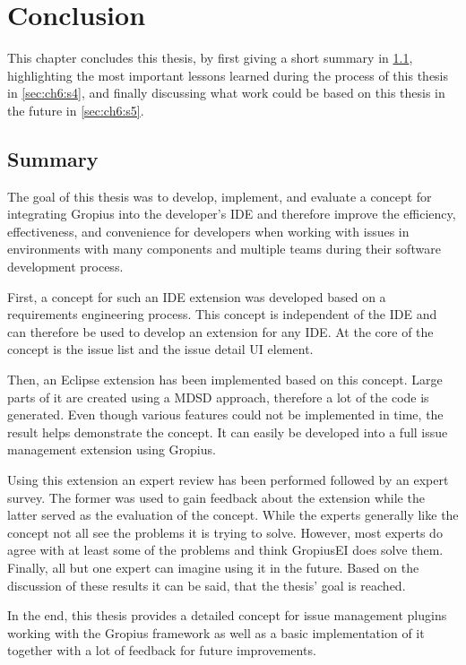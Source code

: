 
\chapter{Conclusion}
\label{chap:ch6}
This chapter concludes this thesis, by first giving a short summary in \cref{sec:ch6:s1}, highlighting the most important lessons learned during the process of this thesis in \cref{sec:ch6:s4}, and finally discussing what work could be based on this thesis in the future in \cref{sec:ch6:s5}.

\section{Summary}
\label{sec:ch6:s1}
The goal of this thesis was to develop, implement, and evaluate a concept for integrating \gls{Gropius} into the developer's \gls{IDE} and therefore improve the efficiency, effectiveness, and convenience for developers when working with issues in environments with many components and multiple teams during their software development process.

First, a concept for such an \gls{IDE} extension was developed based on a requirements engineering process.
This concept is independent of the \gls{IDE} and can therefore be used to develop an extension for any \gls{IDE}.
At the core of the concept is the issue list and the issue detail \gls{UI} element.

Then, an \gls{Eclipse} extension has been implemented based on this concept.
Large parts of it are created using a \gls{MDSD} approach, therefore a lot of the code is generated.
Even though various features could not be implemented in time, the result helps demonstrate the concept.
It can easily be developed into a full issue management extension using \gls{Gropius}.

Using this extension an expert review has been performed followed by an expert survey.
The former was used to gain feedback about the extension while the latter served as the evaluation of the concept.
While the experts generally like the concept not all see the problems it is trying to solve.
However, most experts do agree with at least some of the problems and think \gls{GropiusEI} does solve them.
Finally, all but one expert can imagine using it in the future.
Based on the discussion of these results it can be said, that the thesis' goal is reached.

In the end, this thesis provides a detailed concept for issue management plugins working with the \gls{Gropius} framework as well as a basic implementation of it together with a lot of feedback for future improvements.

